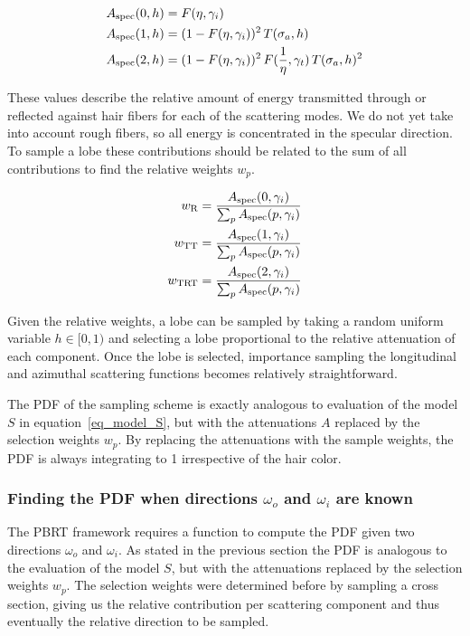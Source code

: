 \documentclass[11pt,a4paper]{report}
\begin{document}
\begin{align}
A_{\textnormal{spec}}(0, h) &= F(\eta, \gamma_i) \\
A_{\textnormal{spec}}(1, h) &= (1 - F(\eta, \gamma_i))^2 \, T(\sigma_a, h) \\
A_{\textnormal{spec}}(2, h) &= (1 - F(\eta, \gamma_i))^2 \, F(\frac{1}{\eta}, \gamma_t) \, T(\sigma_a, h)^2
\end{align}

These values describe the relative amount of energy transmitted through or reflected against hair fibers for each of the scattering modes. We do not yet take into account rough fibers, so all energy is concentrated in the specular direction. To sample a lobe these contributions should be related to the sum of all contributions to find the relative weights $w_p$.

\begin{align}
w_{\textnormal{R}} &= \frac{A_{\textnormal{spec}}(0, \gamma_i)}{\sum_p A_{\textnormal{spec}}(p, \gamma_i)} \\
w_{\textnormal{TT}} &= \frac{A_{\textnormal{spec}}(1, \gamma_i)}{\sum_p A_{\textnormal{spec}}(p, \gamma_i)} \\
w_{\textnormal{TRT}} &= \frac{A_{\textnormal{spec}}(2, \gamma_i)}{\sum_p A_{\textnormal{spec}}(p, \gamma_i)}
\end{align}

Given the relative weights, a lobe can be sampled by taking a random uniform variable $h \in [0, 1)$ and selecting a lobe proportional to the relative attenuation of each component. Once the lobe is selected, importance sampling the longitudinal and azimuthal scattering functions becomes relatively straightforward.

The PDF of the sampling scheme is exactly analogous to evaluation of the model $S$ in equation~\ref{eq_model_S}, but with the attenuations $A$ replaced by the selection weights $w_p$. By replacing the attenuations with the sample weights, the PDF is always integrating to 1 irrespective of the hair color.


\subsubsection{Finding the PDF when directions $\omega_o$ and $\omega_i$ are known}

The PBRT framework requires a function to compute the PDF given two directions $\omega_o$ and $\omega_i$. As stated in the previous section the PDF is analogous to the evaluation of the model $S$, but with the attenuations replaced by the selection weights $w_p$. The selection weights were determined before by sampling a cross section, giving us the relative contribution per scattering component and thus eventually the relative direction to be sampled.
\end{document}
